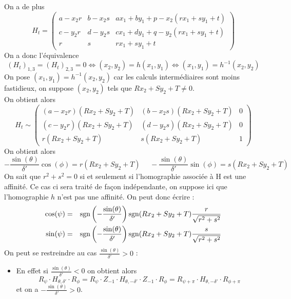  On a de plus 
 \begin{equation*}
 H_t=\begin{pmatrix}
 a-x_2 r&b-x_2 s& a x_1 + b y_1 + p -x_2 (r x_1 +s y_1 +t)\\
  c-y_2 r&d-y_2 s& c x_1 + d y_1 + q -y_2 (r x_1 +s y_1 +t)\\
  r & s & r x_1 + s y_1 +t
 \end{pmatrix}
 \end{equation*}
 On a donc l'équivalence 
 \begin{equation*}
 (H_t)_{1,3}=(H_t)_{2,3}=0 \iff (x_2,y_2)=h(x_1,y_1) \iff (x_1,y_1)=h^{-1}(x_2,y_2)
 \end{equation*}
 On pose $(x_1,y_1)=h^{-1}(x_2,y_2)$ car les calculs intermédiaires sont moins fastidieux, on suppose $(x_2,y_2)$ tels que $R x_2 +S y_2 + T \ne 0$.\\
On obtient alors
\begin{equation*}
H_t
  \sim 
  \begin{pmatrix}
 (a-x_2 r)(R x_2 + S y_2 +T)&(b-x_2 s)(R x_2 + S y_2 +T)& 0\\
  (c-y_2 r)(R x_2 + S y_2 +T)&(d-y_2 s)(R x_2 + S y_2 +T)& 0\\
  r(R x_2 + S y_2 +T) & s(R x_2 + S y_2 +T) &1
  \end{pmatrix} 
\end{equation*}
On obtient alors 
 \begin{equation*}
 -\frac{\sin(\theta)}{\delta'}\cos(\phi)=r(R x_2 + S y_2 +T)~~~~~~ -\frac{\sin(\theta)}{\delta'}\sin(\phi)=s(R x_2 + S y_2 +T)
 \end{equation*}
 On sait que $r^{2}+s^{2}=0$ si et seulement si l'homographie associée à H est une affinité. Ce cas ci sera traité de façon indépendante, on suppose ici que l'homographie $h$ n'est pas une affinité. On peut donc écrire :
 \begin{eqnarray*}
 \cos(\psi) &=& \operatorname{sgn}\left(-\frac{\sin(\theta)}{ \delta'}\right)\operatorname{sgn}(R x_2 + S y_2 +T)\frac{r}{\sqrt{r^{2}+s^{2}}}\\
 \sin(\psi) &=& \operatorname{sgn}\left(-\frac{\sin(\theta)}{ \delta'}\right)\operatorname{sgn}(R x_2 + S y_2 +T)\frac{s}{\sqrt{r^{2}+s^{2}}}
 \end{eqnarray*}
 On peut se restreindre au cas $\frac{\sin(\theta)}{\delta'}>0$ :\\
 \begin{itemize}
 \item En effet si $\frac{\sin(\theta)}{\delta'}<0$ on obtient alors
 \begin{equation*}
 R_{\psi} \cdot H_{\theta,\delta'} \cdot R_{\phi}=R_{\psi} \cdot Z_{-1}\cdot H_{\theta,-\delta'}\cdot Z_{-1} \cdot R_{\phi}= R_{\psi+\pi} \cdot H_{\theta,-\delta'}\cdot R_{\phi+\pi}
 \end{equation*}
 et on a $-\frac{\sin(\theta)}{\delta'}>0$.\\
 \end{itemize}


